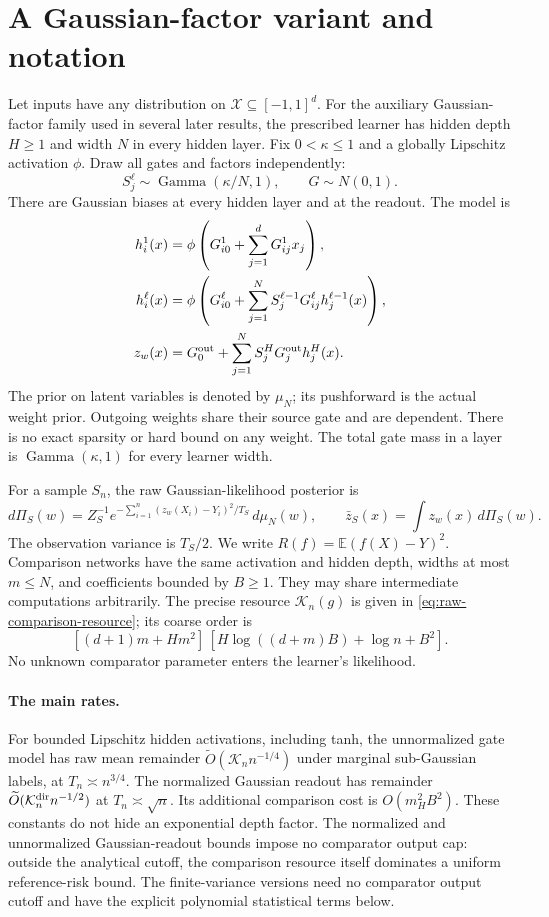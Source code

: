 \documentclass[11pt]{article}
\theoremstyle{remark}\newtheorem{remark}[theorem]{Remark}
\newcommand{\E}{\mathbb E}\newcommand{\R}{\mathbb R}
\begin{document}


\section{A Gaussian-factor variant and notation}
Let inputs have any distribution on $\mathcal X\subseteq[-1,1]^d$.
For the auxiliary Gaussian-factor family used in several later results, the prescribed learner has hidden depth $H\ge1$ and width $N$ in every
hidden layer. Fix $0<\kappa\le1$ and a globally Lipschitz activation
$\phi$. Draw all gates and factors independently:
\[
 S_j^\ell\sim\operatorname{Gamma}(\kappa/N,1),\qquad G\sim N(0,1).
\]
There are Gaussian biases at every hidden layer and at the readout.
The model is
\begin{align*}
 h_i^1(x)&=\phi\left(G_{i0}^1+\sum_{j=1}^dG_{ij}^1x_j\right),\\
 h_i^\ell(x)&=\phi\left(G_{i0}^\ell+
       \sum_{j=1}^NS_j^{\ell-1}G_{ij}^\ell h_j^{\ell-1}(x)\right),\\
 z_w(x)&=G_0^{\rm out}+\sum_{j=1}^NS_j^HG_j^{\rm out}h_j^H(x).
\end{align*}
The prior on latent variables is denoted by $\mu_N$; its pushforward is
the actual weight prior. Outgoing weights share their source gate and
are dependent. There is no exact sparsity or hard bound on any weight.
The total gate mass in a layer is $\operatorname{Gamma}(\kappa,1)$
for every learner width.

For a sample $S_n$, the raw Gaussian-likelihood posterior is
\[
 d\Pi_S(w)=Z_S^{-1}
 e^{-\sum_{i=1}^n(z_w(X_i)-Y_i)^2/T_S}\,d\mu_N(w),
 \qquad\bar z_S(x)=\int z_w(x)\,d\Pi_S(w).
\]
The observation variance is $T_S/2$. We write
$R(f)=\E(f(X)-Y)^2$. Comparison networks have the same activation
and hidden depth, widths at most $m\le N$, and coefficients bounded
by $B\ge1$. They may share intermediate computations arbitrarily.
The precise resource $\mathcal K_n(g)$ is given in
\eqref{eq:raw-comparison-resource}; its coarse order is
\[
 [(d+1)m+Hm^2]\,[H\log((d+m)B)+\log n+B^2].
\]
No unknown comparator parameter enters the learner's likelihood.

\paragraph{The main rates.}
For bounded Lipschitz hidden activations, including tanh, the unnormalized
gate model has raw mean remainder $\widetilde O(\mathcal K_n n^{-1/4})$
under marginal sub-Gaussian labels, at $T_n\asymp n^{3/4}$.
The normalized Gaussian readout has remainder
$\widetilde O(\mathcal K_n^{\rm dir}n^{-1/2})$ at
$T_n\asymp\sqrt n$. Its additional comparison cost is
$O(m_H^2B^2)$. These constants do not hide an exponential depth factor.
The normalized and unnormalized Gaussian-readout bounds impose no comparator output cap: outside the analytical cutoff, the comparison resource itself dominates a uniform reference-risk bound. The finite-variance versions need no comparator
output cutoff and have the explicit polynomial statistical terms below.
\end{document}
